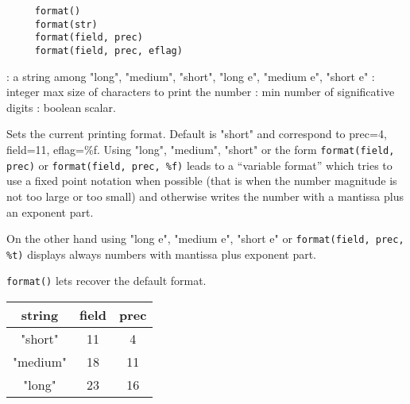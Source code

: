 

\begin{mandesc}
\end{mandesc}


\begin{calling_sequence}
   \begin{verbatim}
     format()
     format(str)
     format(field, prec)
     format(field, prec, eflag)
   \end{verbatim}
\end{calling_sequence}


\begin{parameters}

  \begin{varlist}
    : a string among "long", "medium", "short", "long e", "medium e", "short e"
    : integer max size of characters to print the number
    : min number of significative digits
    : boolean scalar.
  \end{varlist}

  \end{parameters}

  \begin{mandescription}
    Sets the current printing format. Default is "short" and
    correspond to prec=4, field=11, eflag=\%f. Using
    "long", "medium", "short" or the form \verb+format(field, prec)+
    or \verb+format(field, prec, %f)+ leads to a ``variable format'' 
    which tries to use a fixed point notation when possible (that
    is when the number magnitude is not too large or too small) and 
    otherwise writes the number with a mantissa plus an exponent
    part.

    On the other hand using  "long e", "medium e", "short e" or
     \verb+format(field, prec, %t)+  displays always numbers
    with mantissa plus exponent part.

    \verb+format()+ lets recover the default format.

  \begin{tabular}{|c|c|c|}
     string & field & prec \\
  \hline
   "short"   & 11 & 4 \\
   "medium"  & 18 & 11 \\
   "long"    & 23 & 16 \\
   \end{tabular}


  \end{mandescription}

